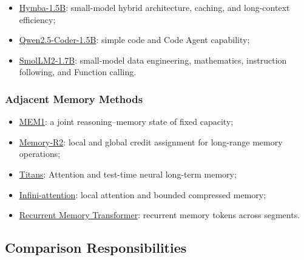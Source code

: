 \begin{itemize}
  \item \href{https://arxiv.org/abs/2411.13676}{Hymba-1.5B}: small-model hybrid architecture, caching, and long-context efficiency;
  \item \href{https://arxiv.org/abs/2409.12186}{Qwen2.5-Coder-1.5B}: simple code and Code Agent capability;
  \item \href{https://huggingface.co/HuggingFaceTB/SmolLM2-1.7B/blob/main/README.md}{SmolLM2-1.7B}: small-model data engineering, mathematics, instruction following, and Function calling.
\end{itemize}

\subsubsection{Adjacent Memory Methods}

\begin{itemize}
  \item \href{https://arxiv.org/abs/2506.15841}{MEM1}: a joint reasoning--memory state of fixed capacity;
  \item \href{https://arxiv.org/abs/2605.21768}{Memory-R2}: local and global credit assignment for long-range memory operations;
  \item \href{https://arxiv.org/abs/2501.00663}{Titans}: Attention and test-time neural long-term memory;
  \item \href{https://arxiv.org/abs/2404.07143}{Infini-attention}: local attention and bounded compressed memory;
  \item \href{https://arxiv.org/abs/2207.06881}{Recurrent Memory Transformer}: recurrent memory tokens across segments.
\end{itemize}

\subsection{Comparison Responsibilities}

